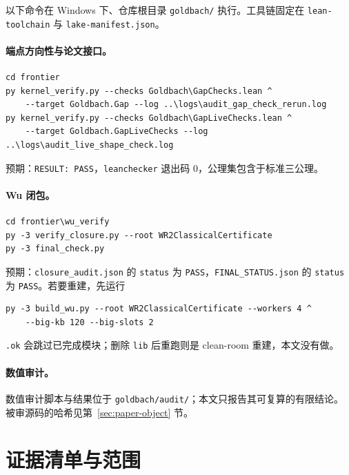 \documentclass[11pt,a4paper]{ctexart}
\theoremstyle{plain}
\theoremstyle{definition}
\begin{document}
以下命令在 Windows 下、仓库根目录 \texttt{goldbach/} 执行。工具链固定在 \texttt{lean-toolchain} 与 \texttt{lake-manifest.json}。

\paragraph{端点方向性与论文接口。}
\begin{verbatim}
cd frontier
py kernel_verify.py --checks Goldbach\GapChecks.lean ^
    --target Goldbach.Gap --log ..\logs\audit_gap_check_rerun.log
py kernel_verify.py --checks Goldbach\GapLiveChecks.lean ^
    --target Goldbach.GapLiveChecks --log ..\logs\audit_live_shape_check.log
\end{verbatim}
预期：\texttt{RESULT: PASS}，\texttt{leanchecker} 退出码 0，公理集包含于标准三公理。

\paragraph{Wu 闭包。}
\begin{verbatim}
cd frontier\wu_verify
py -3 verify_closure.py --root WR2ClassicalCertificate
py -3 final_check.py
\end{verbatim}
预期：\texttt{closure\_audit.json} 的 \texttt{status} 为 \texttt{PASS}，\texttt{FINAL\_STATUS.json} 的 \texttt{status} 为 \texttt{PASS}。若要重建，先运行
\begin{verbatim}
py -3 build_wu.py --root WR2ClassicalCertificate --workers 4 ^
    --big-kb 120 --big-slots 2
\end{verbatim}
\texttt{.ok} 会跳过已完成模块；删除 \texttt{lib} 后重跑则是 clean-room 重建，本文没有做。

\paragraph{数值审计。}
数值审计脚本与结果位于 \texttt{goldbach/audit/}；本文只报告其可复算的有限结论。被审源码的哈希见第~\ref{sec:paper-object} 节。

\section{证据清单与范围}
\label{app:evidence}
\end{document}
